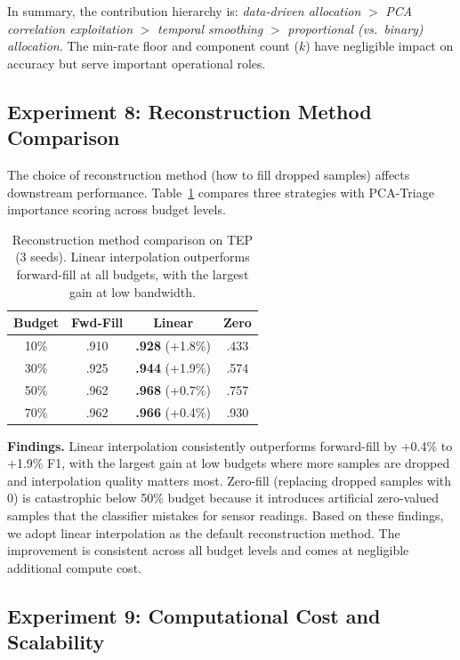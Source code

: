 \documentclass[journal]{IEEEtran}
\begin{document}
In summary, the contribution hierarchy is: \textit{data-driven allocation} $>$ \textit{PCA correlation exploitation} $>$ \textit{temporal smoothing} $>$ \textit{proportional (vs.\ binary) allocation}. The min-rate floor and component count ($k$) have negligible impact on accuracy but serve important operational roles.

\subsection{Experiment 8: Reconstruction Method Comparison}

The choice of reconstruction method (how to fill dropped samples) affects downstream performance. Table~\ref{tab:recon} compares three strategies with PCA-Triage importance scoring across budget levels.

\begin{table}[t]
\centering
\caption{Reconstruction method comparison on TEP (3 seeds). Linear interpolation outperforms forward-fill at all budgets, with the largest gain at low bandwidth.}
\begin{tabular}{@{}cccc@{}}
\toprule
\textbf{Budget} & \textbf{Fwd-Fill} & \textbf{Linear} & \textbf{Zero} \\
\midrule
10\% & .910 & \textbf{.928} (+1.8\%) & .433 \\
30\% & .925 & \textbf{.944} (+1.9\%) & .574 \\
50\% & .962 & \textbf{.968} (+0.7\%) & .757 \\
70\% & .962 & \textbf{.966} (+0.4\%) & .930 \\
\bottomrule
\end{tabular}
\label{tab:recon}
\end{table}

\textbf{Findings.} Linear interpolation consistently outperforms forward-fill by +0.4\% to +1.9\% F1, with the largest gain at low budgets where more samples are dropped and interpolation quality matters most. Zero-fill (replacing dropped samples with 0) is catastrophic below 50\% budget because it introduces artificial zero-valued samples that the classifier mistakes for sensor readings. Based on these findings, we adopt linear interpolation as the default reconstruction method. The improvement is consistent across all budget levels and comes at negligible additional compute cost.

\subsection{Experiment 9: Computational Cost and Scalability}
\end{document}
